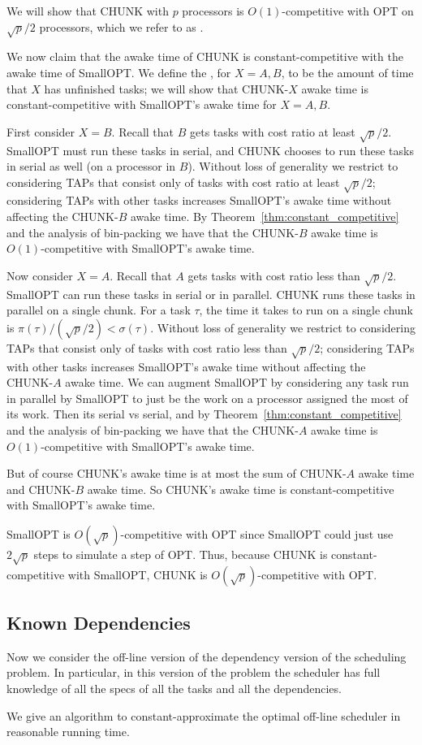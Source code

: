 We will show that CHUNK with $p$ processors is $O(1)$-competitive
with OPT on $\sqrt{p}/2$ processors, which we refer to as
.

We now claim that the awake time of CHUNK is constant-competitive
with the awake time of SmallOPT. We define the , for $X=A,B$, to be the amount of time that $X$ has
unfinished tasks; we will show that CHUNK-$X$ awake time is
constant-competitive with SmallOPT's awake time for $X=A,B$.

First consider $X=B$. Recall that $B$ gets tasks with cost ratio
at least $\sqrt{p}/2$. SmallOPT must run these tasks in serial,
and CHUNK chooses to run these tasks in serial as well (on a
processor in $B$). Without loss of generality we restrict to
considering TAPs that consist only of tasks with cost ratio at
least $\sqrt{p}/2$; considering TAPs with other tasks increases
SmallOPT's awake time without affecting the CHUNK-$B$ awake time.
By Theorem~\ref{thm:constant_competitive} and the analysis of
bin-packing we have that the CHUNK-$B$ awake time is
$O(1)$-competitive with SmallOPT's awake time.

Now consider $X=A$. Recall that $A$ gets tasks with cost ratio
less than $\sqrt{p}/2$. SmallOPT can run these tasks in serial or
in parallel. CHUNK runs these tasks in parallel on a single
chunk. For a task $\tau$, the time it takes to run on a single
chunk is $\pi(\tau)/(\sqrt{p}/2) < \sigma(\tau)$. Without loss of
generality we restrict to considering TAPs that consist only of
tasks with cost ratio less than $\sqrt{p}/2$; considering TAPs
with other tasks increases SmallOPT's awake time without
affecting the CHUNK-$A$ awake time. We can augment SmallOPT by
considering any task run in parallel by SmallOPT to just be the
work on a processor assigned the most of its work. Then its
serial vs serial, and by Theorem~\ref{thm:constant_competitive}
and the analysis of bin-packing we have that the CHUNK-$A$ awake
time is $O(1)$-competitive with SmallOPT's awake time.

But of course CHUNK's awake time is at most the sum of CHUNK-$A$
awake time and CHUNK-$B$ awake time. So CHUNK's awake time is
constant-competitive with SmallOPT's awake time.

SmallOPT is $O(\sqrt{p})$-competitive with OPT since SmallOPT
could just use $2\sqrt{p}$ steps to simulate a step of OPT. Thus,
because CHUNK is constant-competitive with SmallOPT, CHUNK is
$O(\sqrt{p})$-competitive with OPT. 

\subsection{Known Dependencies}
Now we consider the off-line version of the dependency version of
the scheduling problem. In particular, in this version of the
problem the scheduler has full knowledge of all the specs of all
the tasks and all the dependencies.

We give an algorithm to constant-approximate the optimal off-line
scheduler in reasonable running time.

